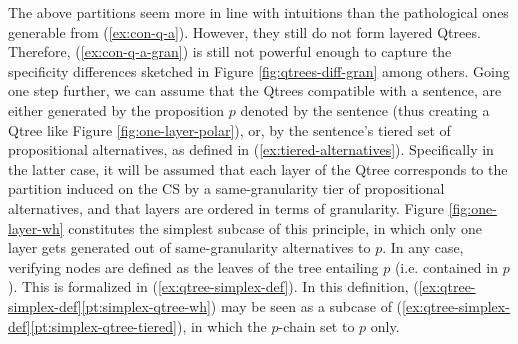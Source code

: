 The above partitions seem more in line with intuitions than the pathological ones generable from (\ref{ex:con-q-a}). However, they still do not form layered Qtrees. Therefore, (\ref{ex:con-q-a-gran}) is still not powerful enough to capture the specificity differences sketched in Figure \ref{fig:qtrees-diff-gran} among others. Going one step further, we can assume that the Qtrees compatible with a sentence, are either generated by the proposition $p$ denoted by the sentence (thus creating a Qtree like Figure \ref{fig:one-layer-polar}), or, by the sentence's tiered set of propositional alternatives, as defined in (\ref{ex:tiered-alternatives}). Specifically in the latter case, it will be assumed that each layer of the Qtree corresponds to the partition induced on the CS by a same-granularity tier of propositional alternatives, and that layers are ordered in terms of granularity. Figure \ref{fig:one-layer-wh} constitutes the simplest subcase of this principle, in which only one layer gets generated out of same-granularity alternatives to $p$. In any case, verifying nodes are defined as the leaves of the tree entailing $p$ (i.e. contained in $p$). This is formalized in (\ref{ex:qtree-simplex-def}). In this definition, (\ref{ex:qtree-simplex-def}\ref{pt:simplex-qtree-wh}) may be seen as a subcase of (\ref{ex:qtree-simplex-def}\ref{pt:simplex-qtree-tiered}), in which the $p$-chain set to $p$ only.

